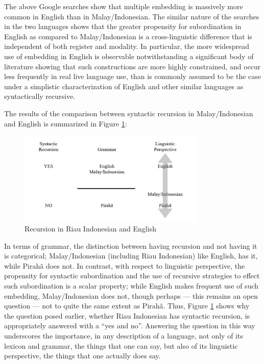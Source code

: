 \documentclass[output=paper,colorlinks,citecolor=brown
]{langscibook}
\begin{document}
The above Google searches show that multiple embedding is massively more common in English than in Malay/Indonesian.  The similar nature of the searches in the two languages shows that the greater propensity for subordination in English as compared to Malay/Indonesian is  a cross-linguistic difference that is independent of both register and modality.  In particular, the more widespread use of embedding in English is observable notwithstanding a significant body of literature \citep{karlsson2007aconstraints,karlsson2007bconstraints,karlsson2009aorigin,karlsson2009bsyntactic} showing that such constructions are more highly constrained, and occur less frequently in real live language use, than is commonly assumed to be the case under a simplistic characterization of English and other similar languages as syntactically recursive.

The results of the comparison between syntactic recursion in Malay/Indonesian and English is summarized in Figure \ref{fig:gil:fig5}:

\begin{figure}
\centering
\includegraphics[width=0.8\textwidth]{gil_figure5.png}
\caption{\label{fig:gil:fig5}Recursion in Riau Indonesian and English}
\end{figure}

In terms of grammar, the distinction between having recursion and not having it is categorical; Malay/Indonesian (including Riau Indonesian) like English, has it, while Pirahã does not.  In contrast, with respect to linguistic perspective, the propensity for syntactic subordination and the use of recursive strategies to effect such subordination is a scalar property; while English makes frequent use of such embedding, Malay/Indonesian does not, though perhaps — this remains an open question — not to quite the same extent as Pirahã.  Thus, Figure \ref{fig:gil:fig5} shows why the question posed earlier, whether Riau Indonesian has syntactic recursion, is appropriately answered with a ``yes and no''.  Answering the question in this way underscores the importance, in any description of a language, not only of its lexicon and grammar, the things that one can say, but also of its linguistic perspective, the things that one actually does say.
\end{document}
